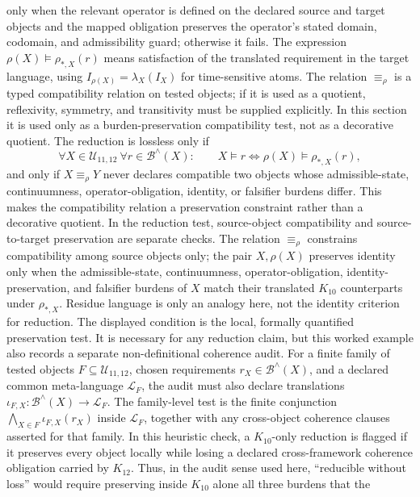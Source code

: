 only when the relevant operator is defined on the declared source and target
objects and the mapped obligation preserves the operator's stated domain,
codomain, and admissibility guard; otherwise it fails. The expression
\(\rho(X)\models\rho_{\ast,X}(r)\) means satisfaction
of the translated requirement in the target language, using
\(I_{\rho(X)}=\lambda_X(I_X)\) for time-sensitive atoms. The relation
\(\equiv_{\rho}\) is a typed compatibility relation on tested objects; if it
is used as a quotient, reflexivity, symmetry, and transitivity must be supplied
explicitly. In this section it is used only as a burden-preservation
compatibility test, not
as a decorative quotient. The reduction is lossless only if
\[
  \forall X\in\mathcal{U}_{11,12}\ \forall r\in\mathcal{B}^{\wedge}(X):
  \qquad X\models r \Longleftrightarrow \rho(X)\models \rho_{\ast,X}(r),
\]
and only if \(X\equiv_{\rho}Y\) never declares compatible two objects whose
admissible-state, continuumness, operator-obligation, identity, or falsifier burdens differ. This
makes the compatibility relation a preservation constraint rather than a
decorative quotient. In the reduction test, source-object compatibility and
source-to-target preservation are separate checks. The relation
\(\equiv_{\rho}\) constrains compatibility among source objects only; the
pair \(X,\rho(X)\) preserves identity only when the admissible-state,
continuumness, operator-obligation, identity-preservation, and falsifier
burdens of \(X\) match their translated \(K_{10}\) counterparts under
\(\rho_{\ast,X}\). Residue language
is only an analogy here, not the identity criterion for reduction.
The displayed condition is the local, formally quantified preservation test.
It is necessary for any reduction claim, but this worked example also records
a separate non-definitional coherence audit. For a finite family of tested
objects \(F\subseteq\mathcal{U}_{11,12}\), chosen requirements
\(r_X\in\mathcal{B}^{\wedge}(X)\), and a declared common meta-language
\(\mathcal{L}_F\), the audit must also declare translations
\(\iota_{F,X}:\mathcal{B}^{\wedge}(X)\to\mathcal{L}_F\). The family-level
test is the finite conjunction
\(\bigwedge_{X\in F}\iota_{F,X}(r_X)\) inside \(\mathcal{L}_F\), together
with any cross-object coherence clauses asserted for that family. In this
heuristic check, a
\(K_{10}\)-only reduction is flagged if it preserves every object locally
while losing a declared cross-framework coherence obligation carried by
\(K_{12}\). Thus, in the audit sense used here, ``reducible without loss''
would require preserving inside \(K_{10}\) alone all three burdens that the
